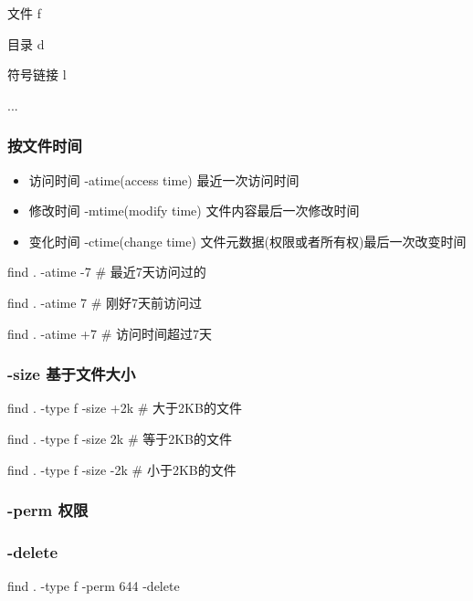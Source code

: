 
文件		f

目录		d

符号链接	l

...


\subsubsection{按文件时间}


\begin{itemize}
\item 访问时间 -atime(access time) 最近一次访问时间
\item 修改时间 -mtime(modify time) 文件内容最后一次修改时间
\item 变化时间 -ctime(change time) 文件元数据(权限或者所有权)最后一次改变时间
\end{itemize}


\begin{Bash}

find . -atime -7  # 最近7天访问过的

find . -atime 7	  # 刚好7天前访问过

find . -atime +7  # 访问时间超过7天

\end{Bash}


\subsubsection{-size 基于文件大小}


\begin{Bash}

find . -type f -size +2k 		# 大于2KB的文件

find . -type f -size 2k			# 等于2KB的文件

find . -type f -size -2k		# 小于2KB的文件
\end{Bash}


\subsubsection{-perm 权限}

\subsubsection{-delete}

\begin{Bash}[删除匹配的文件]

find . -type f -perm 644 -delete


\end{Bash}

